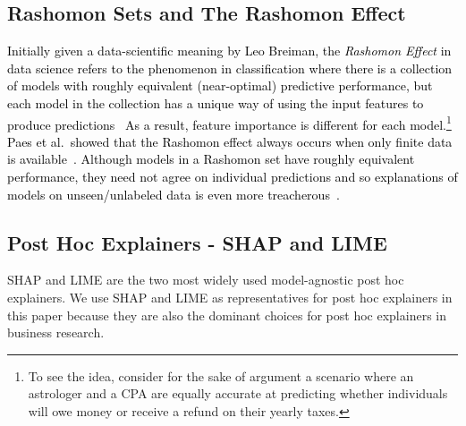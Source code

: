 \documentclass[mnsc,blindrev]{informs3}
\begin{document}
    \subsection{Rashomon Sets and The Rashomon Effect}
        \textcolor{black}{Initially given a data-scientific meaning by Leo Breiman, the \emph{Rashomon Effect} in data science refers to the phenomenon in classification where there is a collection of models with roughly equivalent (near-optimal) predictive performance, but each model in the collection has a unique way of using the input features to produce predictions~\cite{donnelly2023rashomon,rudin2024amazingthingscomehaving} As a result, feature importance is different for each model.\footnote{To see the idea, consider for the sake of argument a scenario where an astrologer and a CPA are equally accurate at predicting whether individuals will owe money or receive a refund on their yearly taxes.} Paes et al.~showed that the Rashomon effect always occurs when only finite data is available~\cite{paes23inevitable}. Although  models in a Rashomon set have roughly equivalent performance, they need not agree on individual predictions and so explanations of models on unseen/unlabeled data is even more treacherous~\cite{hsu2022rashomon}. }  

    \subsection{Post Hoc Explainers - SHAP and LIME}
     SHAP \citep{lundberg17shap} and LIME \citep{ribeiro16lime}  are the two most widely used model-agnostic post hoc explainers. %
        We use SHAP and LIME as representatives for post hoc explainers in this paper because they are also the dominant choices for post hoc explainers in business research.

        
\end{document}
